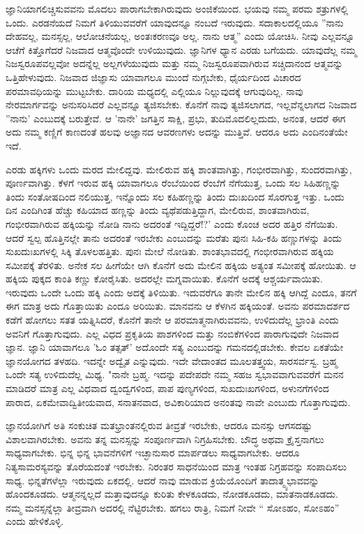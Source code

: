 ಜ್ಞಾನಿಯಾಗಲಿಚ್ಚಿಸುವವನು ಮೊದಲು ಪಾರಾಗಬೇಕಾಗಿರುವುದು ಅಂಜಿಕೆಯಿಂದ. ಭಯವು ನಮ್ಮ ಪರಮ ಶತ್ರುಗಳಲ್ಲಿ ಒಂದು. ಎರಡನೆಯದೆ ನಿಮಗೆ ತಿಳಿಯುವವರೆಗೆ ಯಾವುದನ್ನೂ ನಂಬದೆ ಇರುವುದು. ಸದಾಕಾಲದಲ್ಲಿಯೂ ''ನಾನು ದೇಹವಲ್ಲ, ಮನಸ್ಸಲ್ಲ, ಆಲೋಚನೆಯಲ್ಲ, ಅಂತಃಕರಣವೂ ಅಲ್ಲ. ನಾನು ಆತ್ಮ” ಎಂದು ಯೋಚಿಸಿ. ನೀವು ಎಲ್ಲವನ್ನೂ ಆಚೆಗೆ ಕಿತ್ತೊಗೆದರೆ ನಿಜವಾದ ಆತ್ಮವೊಂದೇ ಉಳಿಯುವುದು. ಜ್ಞಾನಿಗಳ ಧ್ಯಾನ ಎರಡು ಬಗೆಯದು. ಯಾವುದೆಲ್ಲ ನಮ್ಮ ನಿಜಸ್ವರೂಪವಲ್ಲವೋ ಅದನ್ನೆಲ್ಲ ಅಲ್ಲಗಳೆಯುವುದು ಮತ್ತು ನಮ್ಮ ನಿಜಸ್ವರೂಪವಾಗಿರುವ ಸಚ್ಚಿದಾನಂದ ಆತ್ಮವನ್ನು ಒತ್ತಿಹೇಳುವುದು. ನಿಜವಾದ ಜಿಜ್ಞಾಸು ಯಾವಾಗಲೂ ಮುಂದೆ ನುಗ್ಗಬೇಕು, ಧೈರ್ಯದಿಂದ ವಿಚಾರದ ಪರಮಾವಧಿಯನ್ನು ಮುಟ್ಟಬೇಕು. ದಾರಿಯ ಮಧ್ಯದಲ್ಲಿ ಎಲ್ಲಿಯೂ ನಿಲ್ಲುವುದಕ್ಕೆ ಆಗುವುದಿಲ್ಲ. ನಾವು ನೇರಮಾರ್ಗವನ್ನು ಅನುಸರಿಸಿದರೆ ಎಲ್ಲವನ್ನೂ ತ್ಯಜಿಸಬೇಕು. ಕೊನೆಗೆ ನಾವು ತ್ಯಜಿಸಲಾಗದ, ಇಲ್ಲವೆನ್ನಲಾಗದ ನಿಜವಾದ ''ನಾನು' ಎಂಬುದಕ್ಕೆ ಬರುತ್ತೇವೆ. ಆ 'ನಾನೇ' ಜಗತ್ತಿನ ಸಾಕ್ಷಿ, ಪ್ರಭು, ತುದಿಮೊದಲಿಲ್ಲದುದು, ಅನಂತ, ಆದರೆ ಈಗ ಅದು ನಮ್ಮ ಕಣ್ಣಿಗೆ ಕಾಣದಂತೆ ಹಲವು ಅಜ್ಞಾನದ ಆವರಣಗಳು ಅದನ್ನು ಮುತ್ತಿವೆ. ಆದರೂ ಅದು ಎಂದಿನಂತೆಯೇ ಇದೆ.

ಎರಡು ಹಕ್ಕಿಗಳು ಒಂದು ಮರದ ಮೇಲಿದ್ದವು. ಮೇಲಿರುವ ಹಕ್ಕಿ ಶಾಂತವಾಗಿತ್ತು, ಗಂಭೀರವಾಗಿತ್ತು, ಸುಂದರವಾಗಿತ್ತು, ಪೂರ್ಣವಾಗಿತ್ತು. ಕೆಳಗೆ ಇರುವ ಹಕ್ಕಿ ಯಾವಾಗಲೂ ರೆಂಬೆಯಿಂದ ರೆಂಬೆಗೆ ನೆಗೆಯುತ್ತ, ಒಂದು ಸಲ ಸಿಹಿಹಣ್ಣನ್ನು ತಿಂದು ಸಂತೋಷದಿಂದ ನಲಿಯುತ್ತ, ಇನ್ನೊಂದು ಸಲ ಕಹಿಹಣ್ಣನ್ನು ತಿಂದು ದುಃಖದಿಂದ ಸೊರಗುತ್ತ ಇತ್ತು. ಒಂದು ದಿನ ಎಂದಿಗಿಂತ ಹೆಚ್ಚು ಕಹಿಯಾದ ಹಣ್ಣನ್ನು ತಿಂದು ವ್ಯಥೆಪಡುತ್ತಿದ್ದಾಗ, ಮೇಲಿರುವ, ಶಾಂತವಾಗಿರುವ, ಗಂಭೀರವಾಗಿರುವ ಹಕ್ಕಿಯನ್ನು ನೋಡಿ ನಾನು ಅದರಂತೆ ಇದ್ದಿದ್ದರೆ!?' ಎಂದು ಕೊಂಚ ಅದರ ಹತ್ತಿರ ನೆಗೆಯಿತು. ಆದರೆ ಸ್ವಲ್ಪ ಹೊತ್ತಿನಲ್ಲೇ ತಾನು ಅದರಂತೆ ಇರಬೇಕು ಎಂಬುದನ್ನು ಮರೆತು ಪುನಃ ಸಿಹಿ-ಕಹಿ ಹಣ್ಣುಗಳನ್ನು ತಿಂದು ಸುಖದುಃಖಗಳಲ್ಲಿ ಸಿಕ್ಕಿ ತೊಳಲಹತ್ತಿತು. ಪುನಃ ಮೇಲೆ ನೋಡಿತು. ಶಾಂತಭಾವದಲ್ಲಿ ಗಂಭೀರವಾಗಿರುವ ಹಕ್ಕಿಯ ಸಮೀಪಕ್ಕೆ ತೆರಳಿತು. ಅನೇಕ ಸಲ ಹೀಗೆಯೇ ಆಗಿ ಕೊನೆಗೆ ಅದು ಮೇಲಿನ ಹಕ್ಕಿಯ ಅತ್ಯಂತ ಸಮೀಪಕ್ಕೆ ಹೋಯಿತು. ಆ ಹಕ್ಕಿಯ ಪುಕ್ಕದ ಕಾಂತಿ ಕಣ್ಣು ಕೋರೈಸಿತು. ಅದರಲ್ಲೇ ಮಗ್ನವಾಯಿತು. ಕೊನೆಗೆ ಅದಕ್ಕೆ ಆಶ್ಚರ್ಯವಾಯಿತು. ಇರುವುದು ಒಂದೇ ಒಂದು ಹಕ್ಕಿ ಎಂದು ಅದಕ್ಕೆ ತಿಳಿಯಿತು. ಇದುವರೆಗೂ ತಾನೇ ಮೇಲಿನ ಹಕ್ಕಿ ಆಗಿದ್ದೆ ಎಂದೂ, ತನಗೆ ಈಗ ಮಾತ್ರ ಅದು ಗೊತ್ತಾಯಿತು ಎಂದೂ ಅರಿಯಿತು. ಮಾನವನು ಆ ಕೆಳಗಿನ ಹಕ್ಕಿಯಂತೆ. ಅವನು ಪರಮಾದರ್ಶದ ಕಡೆಗೆ ಹೋಗಲು ಸತತ ಯತ್ನಿಸಿದರೆ, ಕೊನೆಗೆ ತಾನೇ ಆ ಪರಮಾತ್ಮನಾಗಿರುವವನು, ಉಳಿದುದೆಲ್ಲ ಭ್ರಾಂತಿ ಎಂದು ಅವನಿಗೆ ಗೊತ್ತಾಗುವುದು. ಎಲ್ಲ ವಿಧದ ಪ್ರಕೃತಿಯ ಪಾಶಗಳಿಂದ ಮತ್ತು ನಂಬಿಕೆಗಳಿಂದ ಪಾರಾಗುವುದೇ ನಿಜವಾದ ಜ್ಞಾನ. ಜ್ಞಾನಿ ಯಾವಾಗಲೂ 'ಓಂ ತತ್ಸತ್' ಅದೊಂದೇ ಸತ್ಯ ಎಂಬುದನ್ನು ಗಮನದಲ್ಲಿಡಬೇಕು. ಕೇವಲ ಏಕತೆಯೇ ಜ್ಞಾನಯೋಗದ ತಳಹದಿ. ಇದನ್ನೇ ಅದ್ವೈತ ಎನ್ನುವುದು. ಇದೇ ವೇದಾಂತದ ಮೂಲತತ್ತ್ವಯ, ಸಾರಸರ್ವಸ್ವ. ಬ್ರಹ್ಮ ಒಂದೇ ಸತ್ಯ ಉಳಿದುದೆಲ್ಲ ಮಿಥ್ಯ. "ನಾನೇ ಬ್ರಹ್ಮ. ಇದನ್ನು ಪದೇಪದೇ ನಮ್ಮ ಸಹಜ ಸ್ವಭಾವವಾಗುವವರೆಗೆ ಮನನ ಮಾಡಿದರೆ ಮಾತ್ರ ಎಲ್ಲ ವಿಧವಾದ ದ್ವಂದ್ವಗಳಿಂದ, ಪಾಪ ಪುಣ್ಯಗಳಿಂದ, ಸುಖದುಃಖಗಳಿಂದ, ಅಳುನಗೆಗಳಿಂದ ಪಾರಾದ, ಏಕಮೇವಾದ್ವಿತೀಯವಾದ, ಸನಾತನವಾದ, ಅವಿಕಾರಿಯಾದ ಅನಂತವು ನಾವೇ ಎಂಬುದು ಗೊತ್ತಾಗುವುದು.

ಜ್ಞಾನಯೋಗಿಗೆ ಅತಿ ಸಂಕುಚಿತ ಮತಭ್ರಾಂತನಲ್ಲಿರುವ ತೀವ್ರತೆ ಇರಬೇಕು, ಆದರೂ ಮನಸ್ಸು ಆಗಸದಷ್ಟು ವಿಶಾಲವಾಗಿರಬೇಕು. ಅವನು ತನ್ನ ಮನಸ್ಸನ್ನು ಸಂಪೂರ್ಣವಾಗಿ ನಿಗ್ರಹಿಸಬೇಕು. ಬೌದ್ಧ ಅಥವಾ ಕ್ರೈಸ್ತನಾಗಲು ಸಾಧ್ಯವಾಗಬೇಕು. ಭಿನ್ನ ಭಿನ್ನ ಭಾವನೆಗಳಿಗೆ ಇಚ್ಛಾನುಸಾರ ಮಾರ್ಪಡಲು ಸಾಧ್ಯವಾಗಬೇಕು. ಆದರೂ ನಿತ್ಯಸಾಮರಸ್ಯವನ್ನು ತೊರೆಯದಂತೆ ಇರಬೇಕು. ನಿರಂತರ ಸಾಧನೆಯಿಂದ ಮಾತ್ರ ಇಂತಹ ನಿಗ್ರಹವನ್ನು ಸಂಪಾದಿಸಲು ಸಾಧ್ಯ. ಭಿನ್ನತೆಗಳೆಲ್ಲಾ ಇರುವುದು ಏಕದಲ್ಲಿ. ಆದರೆ ನಾವು ಮಾಡುವ ಕ್ರಿಯೆಯೊಂದಿಗೆ ತಾದಾತ್ಮ್ಯಭಾವವನ್ನು ಹೊಂದಕೂಡದು. ಆತ್ಮನನ್ನಲ್ಲದೆ ಮತ್ತಾವುದನ್ನೂ ಕುರಿತು ಕೇಳಕೂಡದು, ನೋಡಕೂಡದು, ಮಾತನಾಡಕೂಡದು. ನಮ್ಮ ಮನಸ್ಸನ್ನೆಲ್ಲಾ ತೀವ್ರವಾಗಿ ಅದರಲ್ಲಿ ನೆಟ್ಟಿರಬೇಕು. ಹಗಲು ರಾತ್ರಿ, ನಿಮಗೆ ನೀವೇ `` ಸೋಽಹಂ, ಸೋಽಹಂ'' ಎಂದು ಹೇಳಿಕೊಳ್ಳಿ.

